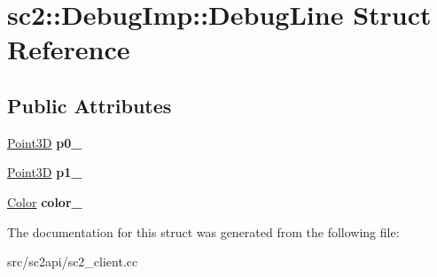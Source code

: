 \hypertarget{structsc2_1_1_debug_imp_1_1_debug_line}{}\section{sc2\+:\+:Debug\+Imp\+:\+:Debug\+Line Struct Reference}
\label{structsc2_1_1_debug_imp_1_1_debug_line}
\subsection*{Public Attributes}
\begin{DoxyCompactItemize}
\item 
\mbox{\label{structsc2_1_1_debug_imp_1_1_debug_line_a1239952e28c95c558c6e8ad0dce1220b}} 
\hyperlink{structsc2_1_1_point3_d}{Point3D} {\bfseries p0\+\_\+}
\item 
\mbox{\label{structsc2_1_1_debug_imp_1_1_debug_line_a857ddafd3d8953d9e706f7dd4527898d}} 
\hyperlink{structsc2_1_1_point3_d}{Point3D} {\bfseries p1\+\_\+}
\item 
\mbox{\label{structsc2_1_1_debug_imp_1_1_debug_line_a8ddc00e892664c322b4f8e204e365018}} 
\hyperlink{structsc2_1_1_color}{Color} {\bfseries color\+\_\+}
\end{DoxyCompactItemize}


The documentation for this struct was generated from the following file\+:\begin{DoxyCompactItemize}
\item 
src/sc2api/sc2\+\_\+client.\+cc\end{DoxyCompactItemize}

